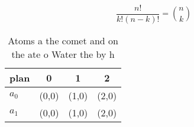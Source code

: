\documentclass[a4paper]{article}
\begin{document}
\[ \frac{n!}{k!(n-k)!} = \binom{n}{k} \]

\begin{table}
\begin{adjustbox}{width=0.6\columnwidth}
\begin{tabular}{|l|l|l|l|}
\hline
\textbf{plan} & \multicolumn{1}{c|}{\textbf{0}} & \multicolumn{1}{c|}{\textbf{1}} & \multicolumn{1}{c|}{\textbf{2}} \\ \hline
\textbf{$a_0$}  & (0,0) & (1,0) & (2,0) \\ \hline
\textbf{$a_1$}  & (0,0) & (1,0) & (2,0) \\ \hline
\end{tabular}
\end{adjustbox}
\caption{Atoms a the comet and on the ate o Water the by h
}
\end{table}
\end{document}
